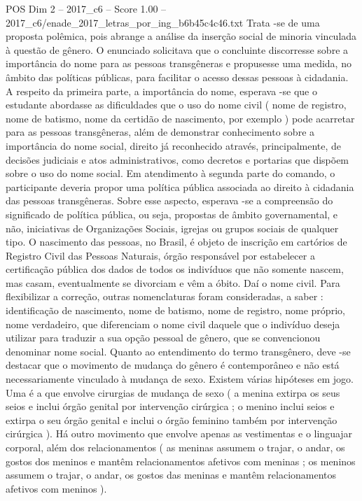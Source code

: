 \begin{textsample}{POS Dim 2 – 2017\_c6 – Score 1.00 – 2017\_c6/enade\_2017\_letras\_por\_ing\_b6b45c4c46.txt}
Trata -se de uma proposta polêmica, pois abrange a análise da inserção social de minoria vinculada à questão de gênero.
O enunciado solicitava que o concluinte discorresse sobre a importância do nome para as pessoas transgêneras e propusesse uma medida, no âmbito das políticas públicas, para facilitar o acesso dessas pessoas à cidadania.
A respeito da primeira parte, a importância do nome, esperava -se que o estudante abordasse as dificuldades que o uso do nome civil ( nome de registro, nome de batismo, nome da certidão de nascimento, por exemplo ) pode acarretar para as pessoas transgêneras, além de demonstrar conhecimento sobre a importância do nome social, direito já reconhecido através, principalmente, de decisões judiciais e atos administrativos, como decretos e portarias que dispõem sobre o uso do nome social.
Em atendimento à segunda parte do comando, o participante deveria propor uma política pública associada ao direito à cidadania das pessoas transgêneras.
Sobre esse aspecto, esperava -se a compreensão do significado de política pública, ou seja, propostas de âmbito governamental, e não, iniciativas de Organizações Sociais, igrejas ou grupos sociais de qualquer tipo.
O nascimento das pessoas, no Brasil, é objeto de inscrição em cartórios de Registro Civil das Pessoas Naturais, órgão responsável por estabelecer a certificação pública dos dados de todos os indivíduos que não somente nascem, mas casam, eventualmente se divorciam e vêm a óbito.
Daí o nome civil.
Para flexibilizar a correção, outras nomenclaturas foram consideradas, a saber : identificação de nascimento, nome de batismo, nome de registro, nome próprio, nome verdadeiro, que diferenciam o nome civil daquele que o indivíduo deseja utilizar para traduzir a sua opção pessoal de gênero, que se convencionou denominar nome social.
Quanto ao entendimento do termo transgênero, deve -se destacar que o movimento de mudança do gênero é contemporâneo e não está necessariamente vinculado à mudança de sexo.
Existem várias hipóteses em jogo.
Uma é a que envolve cirurgias de mudança de sexo ( a menina extirpa os seus seios e inclui órgão genital por intervenção cirúrgica ; o menino inclui seios e extirpa o seu órgão genital e inclui o órgão feminino também por intervenção cirúrgica ).
Há outro movimento que envolve apenas as vestimentas e o linguajar corporal, além dos relacionamentos ( as meninas assumem o trajar, o andar, os gostos dos meninos e mantêm relacionamentos afetivos com meninas ; os meninos assumem o trajar, o andar, os gostos das meninas e mantêm relacionamentos afetivos com meninos ).

\end{textsample}
